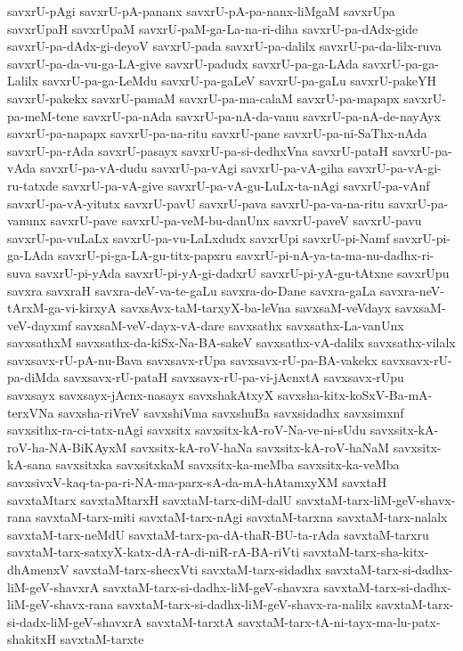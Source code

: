 {savxrU-pAgi
savxrU-pA-pananx
savxrU-pA-pa-nanx-liMgaM
savxrUpa
savxrUpaH
savxrUpaM
savxrU-paM-ga-La-na-ri-diha
savxrU-pa-dAdx-gide
savxrU-pa-dAdx-gi-deyoV
savxrU-pada
savxrU-pa-dalilx
savxrU-pa-da-lilx-ruva
savxrU-pa-da-vu-ga-LA-give
savxrU-padudx
savxrU-pa-ga-LAda
savxrU-pa-ga-Lalilx
savxrU-pa-ga-LeMdu
savxrU-pa-gaLeV
savxrU-pa-gaLu
savxrU-pakeYH
savxrU-pakekx
savxrU-pamaM
savxrU-pa-ma-calaM
savxrU-pa-mapapx
savxrU-pa-meM-tene
savxrU-pa-nAda
savxrU-pa-nA-da-vanu
savxrU-pa-nA-de-nayAyx
savxrU-pa-napapx
savxrU-pa-na-ritu
savxrU-pane
savxrU-pa-ni-SaThx-nAda
savxrU-pa-rAda
savxrU-pasayx
savxrU-pa-si-dedhxVna
savxrU-pataH
savxrU-pa-vAda
savxrU-pa-vA-dudu
savxrU-pa-vAgi
savxrU-pa-vA-giha
savxrU-pa-vA-gi-ru-tatxde
savxrU-pa-vA-give
savxrU-pa-vA-gu-LuLx-ta-nAgi
savxrU-pa-vAnf
savxrU-pa-vA-yitutx
savxrU-pavU
savxrU-pava
savxrU-pa-va-na-ritu
savxrU-pa-vanunx
savxrU-pave
savxrU-pa-veM-bu-danUnx
savxrU-paveV
savxrU-pavu
savxrU-pa-vuLaLx
savxrU-pa-vu-LaLxdudx
savxrUpi
savxrU-pi-Namf
savxrU-pi-ga-LAda
savxrU-pi-ga-LA-gu-titx-papxru
savxrU-pi-nA-ya-ta-ma-nu-dadhx-ri-suva
savxrU-pi-yAda
savxrU-pi-yA-gi-dadxrU
savxrU-pi-yA-gu-tAtxne
savxrUpu
savxra
savxraH
savxra-deV-va-te-gaLu
savxra-do-Dane
savxra-gaLa
savxra-neV-tArxM-ga-vi-kirxyA
savxsAvx-taM-tarxyX-ba-leVna
savxsaM-veVdayx
savxsaM-veV-dayxmf
savxsaM-veV-dayx-vA-dare
savxsathx
savxsathx-La-vanUnx
savxsathxM
savxsathx-da-kiSx-Na-BA-sakeV
savxsathx-vA-dalilx
savxsathx-vilalx
savxsavx-rU-pA-nu-Bava
savxsavx-rUpa
savxsavx-rU-pa-BA-vakekx
savxsavx-rU-pa-diMda
savxsavx-rU-pataH
savxsavx-rU-pa-vi-jAcnxtA
savxsavx-rUpu
savxsayx
savxsayx-jAcnx-nasayx
savxshakAtxyX
savxsha-kitx-koSxV-Ba-mA-terxVNa
savxsha-riVreV
savxshiVma
savxshuBa
savxsidadhx
savxsimxnf
savxsithx-ra-ci-tatx-nAgi
savxsitx
savxsitx-kA-roV-Na-ve-ni-sUdu
savxsitx-kA-roV-ha-NA-BiKAyxM
savxsitx-kA-roV-haNa
savxsitx-kA-roV-haNaM
savxsitx-kA-sana
savxsitxka
savxsitxkaM
savxsitx-ka-meMba
savxsitx-ka-veMba
savxsivxV-kaq-ta-pa-ri-NA-ma-parx-sA-da-mA-hAtamxyXM
savxtaH
savxtaMtarx
savxtaMtarxH
savxtaM-tarx-diM-dalU
savxtaM-tarx-liM-geV-shavx-rana
savxtaM-tarx-miti
savxtaM-tarx-nAgi
savxtaM-tarxna
savxtaM-tarx-nalalx
savxtaM-tarx-neMdU
savxtaM-tarx-pa-dA-thaR-BU-ta-rAda
savxtaM-tarxru
savxtaM-tarx-satxyX-katx-dA-rA-di-niR-rA-BA-riVti
savxtaM-tarx-sha-kitx-dhAmenxV
savxtaM-tarx-shecxVti
savxtaM-tarx-sidadhx
savxtaM-tarx-si-dadhx-liM-geV-shavxrA
savxtaM-tarx-si-dadhx-liM-geV-shavxra
savxtaM-tarx-si-dadhx-liM-geV-shavx-rana
savxtaM-tarx-si-dadhx-liM-geV-shavx-ra-nalilx
savxtaM-tarx-si-dadx-liM-geV-shavxrA
savxtaM-tarxtA
savxtaM-tarx-tA-ni-tayx-ma-lu-patx-shakitxH
savxtaM-tarxte
}
